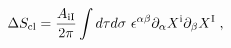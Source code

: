 \begin{equation}
\Delta S_{\rm cl}= {A_{\rm iI}\over 2\pi} \int d\tau d\sigma ~
\epsilon^{\alpha\beta} \partial_\alpha X^{\rm i} \partial_\beta X^{\rm I}\;,
\label{action}
\end{equation}

